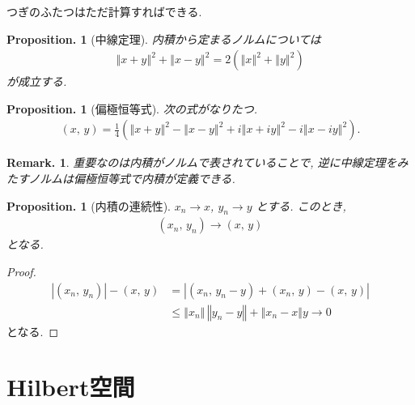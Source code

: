 \documentclass[openany, a4paper, oneside]{jsbook}
\theoremstyle{break}
\newtheorem{prop}[thm]{Proposition.}
\theoremstyle{breakdefn}
\newtheorem{rem}[thm]{Remark.}
\newcommand{\abs}[1]{\left|#1\right|}
\newcommand{\norm}[1]{\left\Vert#1\right\Vert}
\newcommand{\rbk}[1]{\left (#1\right)}
\newcommand{\rbkt}[2]{\left ( #1,\,#2 \right)}
\begin{document}
つぎのふたつはただ計算すればできる.
\begin{prop}[中線定理]
 内積から定まるノルムについては
 \begin{align}
  \norm{x + y}^2 + \norm{x - y}^2
  =
  2 \rbk{\norm{x}^2 + \norm{y}^2}
 \end{align}
 が成立する.
\end{prop}
\begin{prop}[偏極恒等式]
次の式がなりたつ.
\begin{align}
 \rbkt{x}{y}
 =
 \frac{1}{4}\rbk{\norm{x + y}^2 - \norm{x - y}^2 + i \norm{x + iy}^2 - i \norm{x - iy}^2}.
\end{align}
\end{prop}
\begin{rem}
重要なのは内積がノルムで表されていることで,
逆に中線定理をみたすノルムは偏極恒等式で内積が定義できる.
\end{rem}

\begin{prop}[内積の連続性]
 $x_n \to x$, $y_n \to y$ とする.
 このとき,
 \begin{align}
  \rbkt{x_n}{y_n} \to \rbkt{x}{y}
 \end{align}
 となる.
\end{prop}
\begin{proof}
\begin{align}
 \abs{\rbkt{x_n}{y_n}} - \rbkt{x}{y}
 &=
 \abs{\rbkt{x_n}{y_n - y} + \rbkt{x_n}{y} - \rbkt{x}{y}} \\
 &\le
 \norm{x_n} \, \norm{y_n - y} + \norm{x_n - x}{y} \to 0
\end{align}
となる.
\end{proof}
\section{Hilbert空間}
\end{document}
